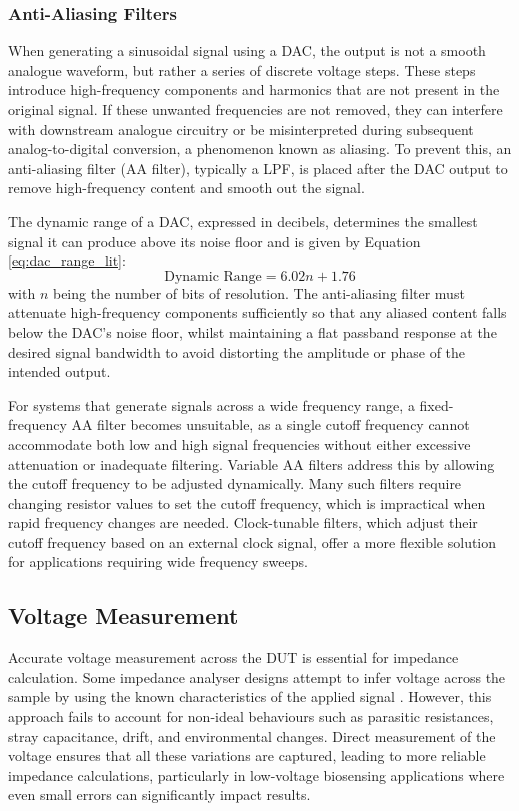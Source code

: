 \subsubsection{Anti-Aliasing Filters}
When generating a sinusoidal signal using a \ac{DAC}, the output is not a smooth analogue waveform, but rather a series of discrete voltage steps. These steps introduce high-frequency components and harmonics that are not present in the original signal. If these unwanted frequencies are not removed, they can interfere with downstream analogue circuitry or be misinterpreted during subsequent analog-to-digital conversion, a phenomenon known as aliasing. To prevent this, an anti-aliasing filter (AA filter), typically a \ac{LPF}, is placed after the DAC output to remove high-frequency content and smooth out the signal.

The dynamic range of a \ac{DAC}, expressed in decibels, determines the smallest signal it can produce above its noise floor and is given by Equation \ref{eq:dac_range_lit}\cite{gaddyDYNAMICPERFORMANCETESTING}:
\begin{equation}
    \text{Dynamic Range} = 6.02n + 1.76 
    \label{eq:dac_range_lit}
\end{equation}
with $n$ being the number of bits of resolution. The anti-aliasing filter must attenuate high-frequency components sufficiently so that any aliased content falls below the DAC's noise floor, whilst maintaining a flat passband response at the desired signal bandwidth to avoid distorting the amplitude or phase of the intended output.

For systems that generate signals across a wide frequency range, a fixed-frequency AA filter becomes unsuitable, as a single cutoff frequency cannot accommodate both low and high signal frequencies without either excessive attenuation or inadequate filtering. Variable AA filters address this by allowing the cutoff frequency to be adjusted dynamically. Many such filters require changing resistor values to set the cutoff frequency, which is impractical when rapid frequency changes are needed. Clock-tunable filters, which adjust their cutoff frequency based on an external clock signal, offer a more flexible solution for applications requiring wide frequency sweeps.

\subsection{Voltage Measurement}
Accurate voltage measurement across the \ac{DUT} is essential for impedance calculation. Some impedance analyser designs attempt to infer voltage across the sample by using the known characteristics of the applied signal \cite{buscagliaSimpleZLowCostPortable2023}. However, this approach fails to account for non-ideal behaviours such as parasitic resistances, stray capacitance, drift, and environmental changes. Direct measurement of the voltage ensures that all these variations are captured, leading to more reliable impedance calculations, particularly in low-voltage biosensing applications where even small errors can significantly impact results.

